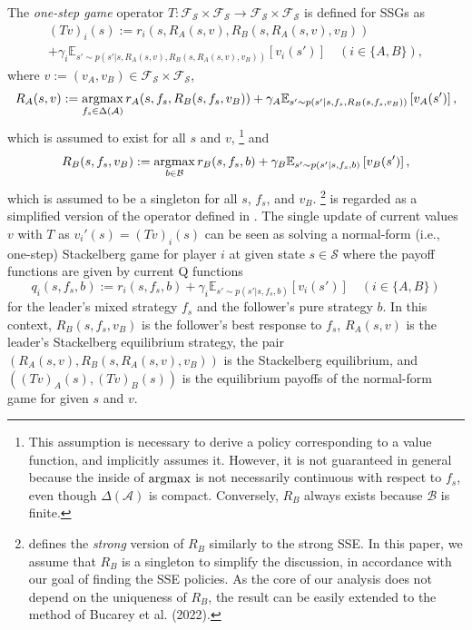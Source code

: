\documentclass{acml}
\providecommand{\argmax}{\operatornamewithlimits{argmax}} %
\providecommand{\E}{\mathbb{E}} %
\providecommand{\x}{\times}
\begin{document}
The \emph{one-step game} operator $T:\mathcal{F}_{\mathcal{S}}\x\mathcal{F}_{\mathcal{S}}\to\mathcal{F}_{\mathcal{S}}\x\mathcal{F}_{\mathcal{S}}$ is defined for SSGs as 
\begin{multline}\label{eq:quasi-SEeq_Bucarey}
	(Tv)_i(s):=r_i(s,R_A(s,v),R_B(s,R_A(s,v),v_B)) \\+ \gamma_i\E_{s'\sim p(s'|s,R_A(s,v),R_B(s,R_A(s,v),v_B))}\left[v_i(s')\right]\quad(i\in\{A,B\}),
\end{multline}
where $v:=(v_A,v_B)\in \mathcal{F}_{\mathcal{S}}\times\mathcal{F}_{\mathcal{S}}$,
\begin{equation*}
	R_A(s,v):=\argmax_{f_s\in\Delta(\mathcal{A})} r_A(s,f_s,R_B(s,f_s,v_B)) + \gamma_A\E_{s'\sim p(s'|s,f_s,R_B(s,f_s,v_B))}\left[v_A(s')\right],
\end{equation*}
which is assumed to exist for all $s$ and $v$,%
\footnote{This assumption is necessary to derive a policy corresponding to a value function, and \citet{Bucarey2022-ro} implicitly assumes it. 
However, it is not guaranteed in general because the inside of $\argmax$ is not necessarily continuous with respect to $f_s$, even though $\Delta(\mathcal{A})$ is compact. 
Conversely, $R_B$ always exists because $\mathcal{B}$ is finite.} 
and
\begin{equation*}
	R_B(s,f_s,v_B):=\argmax_{b\in\mathcal{B}} r_B(s,f_s,b) \\+ \gamma_B\E_{s'\sim p(s'|s,f_s,b)}\left[v_B(s')\right],
\end{equation*}
which is assumed to be a singleton for all $s$, $f_s$, and $v_B$.%
\footnote{\citet{Bucarey2022-ro} defines the \emph{strong} version of $R_B$ similarly to the strong SSE. In this paper, we assume that $R_B$ is a singleton to simplify the discussion, in accordance with our goal of finding the SSE policies. 
As the core of our analysis does not depend on the uniqueness of $R_B$, the result can be easily extended to the method of Bucarey et al. (2022).}
 is regarded as a simplified version of the operator defined in \citet{Bucarey2022-ro}.
The single update of current values $v$ with $T$ as $v_i'(s)=(Tv)_i(s)$ can be seen as solving a normal-form (i.e., one-step) Stackelberg game for player $i$ at given state $s\in\mathcal{S}$ where the payoff functions are given by current Q functions \[q_i(s,f_s,b):=r_i(s,f_s,b)+\gamma_i\E_{s'\sim p(s'|s,f_s,b)}\left[v_i(s')\right]\quad(i\in\{A,B\})\] for the leader's mixed strategy $f_s$ and the follower's pure strategy $b$.
In this context, $R_B(s,f_s,v_B)$ is the follower's best response to $f_s$, $R_A(s,v)$ is the leader's Stackelberg equilibrium strategy, the pair $(R_A(s,v), R_B(s, R_A(s,v),v_B))$ is the Stackelberg equilibrium, and $((Tv)_A(s),(Tv)_B(s))$ is the equilibrium payoffs of the normal-form game for given $s$ and $v$.
\end{document}

